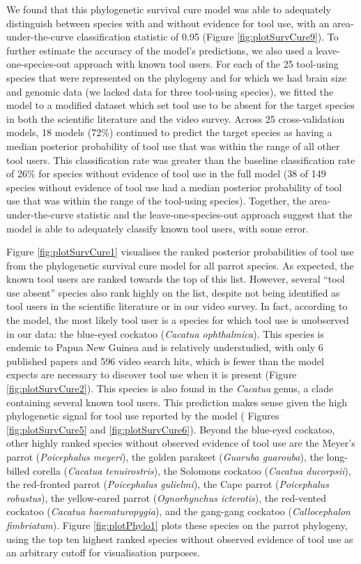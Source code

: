 \documentclass[
  man, donotrepeattitle,floatsintext]{apa6}
\begin{document}
We found that this phylogenetic survival cure model was able to adequately
distinguish between species with and without evidence for tool use, with an
area-under-the-curve classification statistic of
0.95 (Figure
\ref{fig:plotSurvCure9}). To further estimate the accuracy of the model's
predictions, we also used a leave-one-species-out approach with known tool
users. For each of the 25 tool-using species that were represented on the
phylogeny and for which we had brain size and genomic data (we lacked data for
three tool-using species), we fitted the model to a modified dataset which set
tool use to be absent for the target species in both the scientific literature
and the video survey. Across 25 cross-validation models,
18 models (72\%)
continued to predict the target species as having a median posterior probability
of tool use that was within the range of all other tool users. This
classification rate was greater than the baseline classification rate of
26\%
for species without evidence of tool use in the full model
(38
of 149 species without
evidence of tool use had a median posterior probability of tool use that was
within the range of the tool-using species). Together, the area-under-the-curve
statistic and the leave-one-species-out approach suggest that the model is able
to adequately classify known tool users, with some error.

Figure \ref{fig:plotSurvCure1} visualises the ranked posterior probabilities of
tool use from the phylogenetic survival cure model for all parrot species. As
expected, the known tool users are ranked towards the top of this list. However,
several ``tool use absent'' species also rank highly on the list, despite not
being identified as tool users in the scientific literature or in our video
survey. In fact, according to the model, the most likely tool user is a species
for which tool use is unobserved in our data: the blue-eyed cockatoo (\emph{Cacatua
ophthalmica}). This species is endemic to Papua New Guinea and is relatively
understudied, with only 6 published papers
and 596 video search hits, which is fewer than the
model expects are necessary to discover tool use when it is present (Figure
\ref{fig:plotSurvCure2}). This species is also found in the \emph{Cacatua} genus, a
clade containing several known tool users. This prediction makes sense given the
high phylogenetic signal for tool use reported by the model (
Figures \ref{fig:plotSurvCure5} and \ref{fig:plotSurvCure6}). Beyond the
blue-eyed cockatoo, other highly ranked species without observed evidence of
tool use are the Meyer's parrot (\emph{Poicephalus meyeri}), the golden parakeet
(\emph{Guaruba guarouba}), the long-billed corella (\emph{Cacatua tenuirostris}), the
Solomons cockatoo (\emph{Cacatua ducorpsii}), the red-fronted parrot (\emph{Poicephalus
gulielmi}), the Cape parrot (\emph{Poicephalus robustus}), the yellow-eared parrot
(\emph{Ognorhynchus icterotis}), the red-vented cockatoo (\emph{Cacatua haematuropygia}),
and the gang-gang cockatoo (\emph{Callocephalon fimbriatum}). Figure
\ref{fig:plotPhylo1} plots these species on the parrot phylogeny, using the top
ten highest ranked species without observed evidence of tool use as an arbitrary
cutoff for visualisation purposes.
\end{document}
